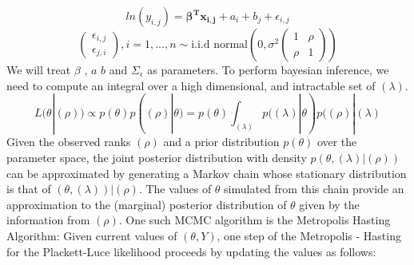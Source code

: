 \documentclass[12pt]{ociamthesis}  %
\begin{document}
	\begin{equation}
	ln(y_{i,j}) = \boldsymbol{\beta^{T} {x_{i,j}}} + a_{i} + b_{j} + \epsilon_{i,j}
	\end{equation}
	\begin{equation}
	\begin{pmatrix}
	\epsilon_{i,j} \\
	\epsilon_{j,i}
	\end{pmatrix}
	, i = 1,...,n \sim \text{i.i.d normal}(0,\sigma^{2} \begin{pmatrix} 1 & \rho \\ \rho & 1 \end{pmatrix})
	\end{equation}
	We will treat \boldmath $\beta$ \unboldmath, \boldmath $a$ \unboldmath \boldmath $b$ \unboldmath and $\Sigma_{\epsilon}$ as parameters. \newline
	To perform bayesian inference, we need to compute an integral over a high dimensional, and intractable set of $(\lambda)$.
	\begin{equation}
		L(\theta | (\rho)) \propto p(\theta)p((\rho) | \theta) = p(\theta)\int_{(\lambda)}p((\lambda) | \theta)p((\rho) | (\lambda)
	\end{equation}
	Given the observed ranks $(\rho)$ and a prior distribution $p(\theta)$ over the parameter space, the joint posterior distribution with density $p(\theta, (\lambda)|(\rho))$ can be approximated by generating a Markov chain whose stationary distribution is that of $(\theta, (\lambda)) | (\rho)$. The values of $\theta$ simulated from this chain provide an approximation to the (marginal) posterior distribution of $\theta$ given by the information from $(\rho)$. \newline
	One such MCMC algorithm is the Metropolis Hasting Algorithm: \newline
	Given current values of $(\theta, Y)$, one step of the Metropolis - Hasting for the Plackett-Luce likelihood proceeds by updating the values as follows:
\end{document}
